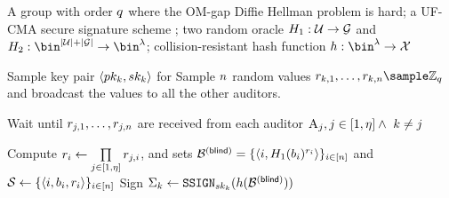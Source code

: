 




\begin{algorithm}[th!]
\caption{\protocolAuthOPRF: protocol realizing \authOPRFFunc}
\label{protocol:authOPRF}
\footnotesize
\begin{algorithmic}[1]



\Require A group \genGrp with order $q$ where the OM-gap Diffie Hellman problem is hard; 
a UF-CMA secure signature scheme \sigSchemeDefn; two random oracle $\oprfRO[1]: \universe \rightarrow \genGrp$ and $\oprfRO[2]: \bin^{\setSize{\universe} + \setSize{\genGrp}} \rightarrow \bin^{\secParam}$; collision-resistant hash function $\hashFn: \bin^{\secParam} \rightarrow \sigOutputSpace$ 

\Statex\Procedure{\publishList}{\blocklist}

 


\State Sample key pair $\langle \auditorPubKeyGenericScheme[\auditorIdx],\auditorPrivKeyGenericScheme[\auditorIdx] \rangle$ for \sigScheme
\State Sample $n$ random values $\genericRand[\auditorIdx, 1], \dots, \genericRand[\auditorIdx, \blocklistSize] \getsr \integersModArg{\genericGrpOrd}$ and broadcast the  values to all the other auditors.  

\State Wait until $\genericRand[j, 1], \dots, \genericRand [j, \blocklistSize]$ are received
from each auditor $\auditor[j], j \in [1, \numAuditors] \land~\auditorIdx \neq j$  

\State Compute $\genericRand[\setIdx] \assign \prod\limits_{j \in [1, \numAuditors]} \genericRand[j, \setIdx]$, and sets $\blindedBlocklist = \{ \langle \setIdx, \oprfRO[1](\genericBlocklistElmt[\setIdx])^{\genericRand[\setIdx]} \rangle\}_{\setIdx \in \nats[\blocklistSize]}$ and $\genericSetVar \assign \{ \langle \setIdx, \genericBlocklistElmt[\setIdx], \genericRand[\setIdx] \rangle \}_{\setIdx \in \nats[\blocklistSize]}$
\EndFor
\State Sign $\auditorSig{\auditorIdx} \assign \signGenSig[\auditorPrivKeyGenericScheme[\auditorIdx]](\hashFn(\blindedBlocklist))$
\EndFor




\end{algorithmic}
\end{algorithm}
